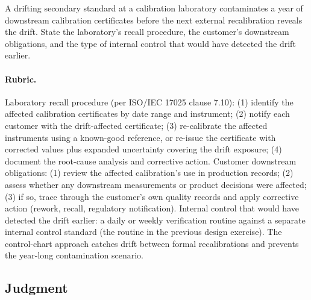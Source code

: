 \begin{exercise}
A drifting secondary standard at a calibration laboratory
contaminates a year of downstream calibration certificates before
the next external recalibration reveals the drift. State the
laboratory's recall procedure, the customer's downstream
obligations, and the type of internal control that would have
detected the drift earlier.

\paragraph{Rubric.} Laboratory recall procedure (per ISO/IEC 17025
clause 7.10): (1) identify the affected calibration certificates by
date range and instrument; (2) notify each customer with the
drift-affected certificate; (3) re-calibrate the affected
instruments using a known-good reference, or re-issue the
certificate with corrected values plus expanded uncertainty
covering the drift exposure; (4) document the root-cause analysis
and corrective action. Customer downstream obligations: (1) review
the affected calibration's use in production records; (2) assess
whether any downstream measurements or product decisions were
affected; (3) if so, trace through the customer's own quality
records and apply corrective action (rework, recall, regulatory
notification). Internal control that would have detected the drift
earlier: a daily or weekly verification routine against a separate
internal control standard (the routine in the previous design
exercise). The control-chart approach catches drift between formal
recalibrations and prevents the year-long contamination scenario.
\end{exercise}

\subsection*{Judgment}

